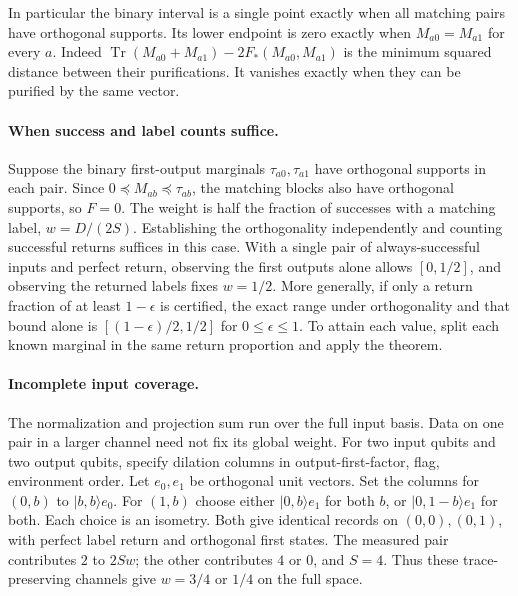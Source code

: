\documentclass[11pt,letterpaper]{article}
\newcommand{\tr}{\operatorname{Tr}}\newcommand{\ket}[1]{\lvert#1\rangle}\newcommand{\proj}[1]{\ket{#1}\!\langle#1\rvert}
\begin{document}
In particular the binary interval is a single point exactly when all matching pairs have orthogonal supports. Its lower endpoint is zero exactly when $M_{a0}=M_{a1}$ for every $a$. Indeed $\tr(M_{a0}+M_{a1})-2F_*(M_{a0},M_{a1})$ is the minimum squared distance between their purifications. It vanishes exactly when they can be purified by the same vector.

\paragraph{When success and label counts suffice.}
Suppose the binary first-output marginals $\tau_{a0},\tau_{a1}$ have orthogonal supports in each pair. Since $0\preceq M_{ab}\preceq\tau_{ab}$, the matching blocks also have orthogonal supports, so $F=0$. The weight is half the fraction of successes with a matching label, $w=D/(2S)$. Establishing the orthogonality independently and counting successful returns suffices in this case. With a single pair of always-successful inputs and perfect return, observing the first outputs alone allows $[0,1/2]$, and observing the returned labels fixes $w=1/2$. More generally, if only a return fraction of at least $1-\epsilon$ is certified, the exact range under orthogonality and that bound alone is $[(1-\epsilon)/2,1/2]$ for $0\le\epsilon\le1$. To attain each value, split each known marginal in the same return proportion and apply the theorem.

\paragraph{Incomplete input coverage.}
The normalization and projection sum run over the full input basis. Data on one pair in a larger channel need not fix its global weight. For two input qubits and two output qubits, specify dilation columns in output-first-factor, flag, environment order. Let $e_0,e_1$ be orthogonal unit vectors. Set the columns for $(0,b)$ to $|b,b\rangle e_0$. For $(1,b)$ choose either $|0,b\rangle e_1$ for both $b$, or $|0,1-b\rangle e_1$ for both. Each choice is an isometry. Both give identical records on $(0,0),(0,1)$, with perfect label return and orthogonal first states. The measured pair contributes $2$ to $2Sw$; the other contributes $4$ or $0$, and $S=4$. Thus these trace-preserving channels give $w=3/4$ or $1/4$ on the full space.
\end{document}
